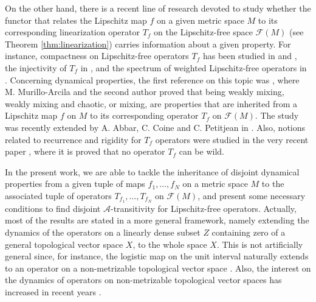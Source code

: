 \documentclass[11pt,reqno]{article}
\newcommand{\free}[1]{\mathcal{F}(#1)} %
\begin{document}
On the other hand, there is a recent line of research devoted to study whether the functor that relates the Lipschitz map $f$ on a given metric space $M$ to its corresponding linearization operator $T_f$ on the Lipschitz-free space $\free{M}$ (see Theorem \ref{thm:linearization}) carries information about a given property. For instance, compactness on Lipschitz-free operators $T_f$ has been studied in \cite{CaJi16} 
 and \cite{JiSeVill14}, the injectivity of $T_f$ in \cite{GarPetPro23}, and the spectrum of weighted Lipschitz-free operators in \cite{ACP2023}. Concerning dynamical properties,  the first reference on this topic was  \cite{MuPe2015}, where M. Murillo-Arcila and the second author proved that being weakly mixing, weakly mixing and chaotic, or mixing, are properties that are inherited from a Lipschitz map $f$ on $M$ to its corresponding operator $T_f$ on $\free{M}$. The study was recently extended by A. Abbar, C. Coine and C. Petitjean in \cite{ACP24,ACP2021}. Also, notions related to recurrence and rigidity for $T_f$ operators were studied in the very recent paper \cite{Ta-Gar24}, where it is proved that no operator $T_f$ can be wild.
 
 In the present work, we are able to tackle the inheritance of disjoint dynamical properties from a given tuple of maps $f_1,\dots,f_N$ on a metric space $M$ to the associated tuple of operators $T_{f_1},\dots ,T_{f_N}$ on  $\free{M}$, and present some necessary conditions to find disjoint $\mathcal{A}$-transitivity for Lipschitz-free operators. Actually, most of the results are stated in a more general framework, namely extending the dynamics of the operators on a linearly dense subset $Z$ containing zero of a general topological vector space $X$, to the whole space $X$. This is not artificially general since, for instance, the logistic map on the unit interval naturally extends to an operator on a non-metrizable topological vector space \cite{MuPe2015}. Also, the interest on the dynamics of operators on non-metrizable topological vector spaces has increased in recent years \cite{Bo00,BoDo12,BoFrPeWe2005,BoKalPe2021,BCarVFav20,DoKa18,GEPe10,Peris18,Shkarin2012}. 
\end{document}
